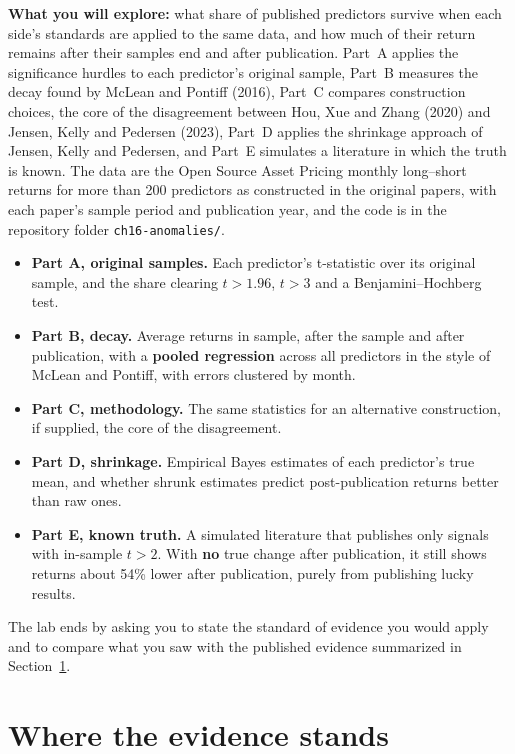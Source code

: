 \textbf{What you will explore:} what share of published predictors survive when each side's standards are applied to the same data, and how much of their return remains after their samples end and after publication. Part~A applies the significance hurdles to each predictor's original sample, Part~B measures the decay found by McLean and Pontiff (2016), Part~C compares construction choices, the core of the disagreement between Hou, Xue and Zhang (2020) and Jensen, Kelly and Pedersen (2023), Part~D applies the shrinkage approach of Jensen, Kelly and Pedersen, and Part~E simulates a literature in which the truth is known. The data are the Open Source Asset Pricing monthly long--short returns for more than 200 predictors as constructed in the original papers, with each paper's sample period and publication year, and the code is in the repository folder \texttt{ch16-anomalies/}.

\begin{itemize}
  \item \textbf{Part A, original samples.} Each predictor's t-statistic over its original sample, and the share clearing $t > 1.96$, $t > 3$ and a Benjamini--Hochberg test.
  \item \textbf{Part B, decay.} Average returns in sample, after the sample and after publication, with a \textbf{pooled regression} across all predictors in the style of McLean and Pontiff, with errors clustered by month.
  \item \textbf{Part C, methodology.} The same statistics for an alternative construction, if supplied, the core of the disagreement.
  \item \textbf{Part D, shrinkage.} Empirical Bayes estimates of each predictor's true mean, and whether shrunk estimates predict post-publication returns better than raw ones.
  \item \textbf{Part E, known truth.} A simulated literature that publishes only signals with in-sample $t > 2$. With \textbf{no} true change after publication, it still shows returns about 54\% lower after publication, purely from publishing lucky results.
\end{itemize}

The lab ends by asking you to state the standard of evidence you would apply and to compare what you saw with the published evidence summarized in Section~\ref{sec:19-verdict}.

\section{Where the evidence stands}
\label{sec:19-verdict}

